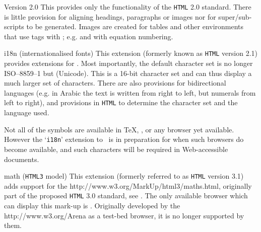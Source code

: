 \begin{htmllist}
\addtolength{\leftskip}{15pt}
%
\item[Version 2.0\label{html20}]
This provides only the functionality of the \texttt{HTML} 2.0 standard.
There is little provision for aligning headings, paragraphs or images
nor for super/sub-scripts to be generated. Images are created for tables 
and other environments that use  tags with \HTMLiii;
e.g.  and  with equation numbering.

%
%
%
%
%
%
%
\item[i18n (internationalised fonts) \strikeout{Version 2.1}]
This extension (formerly known as \texttt{HTML} version 2.1)
provides extensions for .
Most importantly, the default character set is no longer ISO--8859--1 
but  (Unicode).
This is a 16-bit character set and can thus display a much larger set of characters.
There are also provisions for bidirectional languages 
(e.g. in Arabic the text is written from right to left, 
but numerals from left to right), and provisions in \texttt{HTML} 
to determine the character set and the language used.

Not all of the symbols are available in \TeX, \latextohtml, 
or any browser yet available.  
However the `\texttt{i18n}' extension to \latextohtml\ is in preparation
for when such browsers do become available, and such characters
will be required in Web-accessible documents. 


%
%
%
%
\item[math (\texttt{HTML3} model) \strikeout{Version 3.1}]
This extension (formerly referred to as \texttt{HTML} version 3.1)
adds support for the %
{http://www.w3.org/MarkUp/html3/maths.html}, originally
part of the proposed \texttt{HTML} 3.0 standard, see .
The only available browser
which can display this mark-up is .
Originally developed by the %
{http://www.w3.org/Arena} as a test-bed browser,
it is no longer supported by them.


\end{htmllist}
